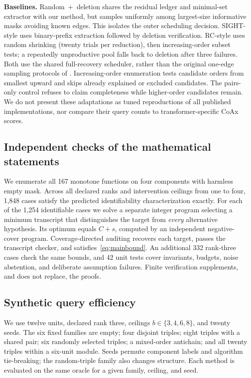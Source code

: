 \documentclass[10pt]{article}
\theoremstyle{definition}\newtheorem{definition}[theorem]{Definition}
\begin{document}
\textbf{Baselines.} Random~+~deletion shares the residual ledger and minimal-set
extractor with our method, but samples uniformly among largest-size informative
masks avoiding known edges. This isolates the outer scheduling decision. SIGHT-style
uses binary-prefix extraction followed by deletion verification. RC-style uses
random shrinking (twenty trials per reduction), then increasing-order subset tests;
a repeatedly unproductive pool falls back to deletion after three failures. Both
use the shared full-recovery scheduler, rather than the original one-edge sampling
protocols of \citet{clarfeld2019}. Increasing-order enumeration tests candidate
orders from smallest upward and skips already explained or excluded candidates.
The pairs-only control refuses to claim completeness while higher-order candidates
remain. We do not present these adaptations as tuned reproductions of all published
implementations, nor compare their query counts to transformer-specific CoAx scores.

\subsection{Independent checks of the mathematical statements}
We enumerate all 167 monotone functions on four components with harmless empty mask.
Across all declared ranks and intervention ceilings from one to four, 1,848 cases
satisfy the predicted identifiability characterization exactly. For each of the
1,254 identifiable cases we solve a separate integer program selecting a minimum
transcript that distinguishes the target from \emph{every} alternative hypothesis.
Its optimum equals $C+s$, computed by an independent negative-cover program.
Coverage-directed auditing recovers each target, passes the transcript checker, and
satisfies~\eqref{eq:mainbound}. An additional 332 rank-three cases check the same
bounds, and 42 unit tests cover invariants, budgets, noise abstention, and deliberate
assumption failures. Finite verification supplements, and does not replace, the proofs.

\subsection{Synthetic query efficiency}
We use twelve units, declared rank three, ceilings $b\in\{3,4,6,8\}$, and twenty seeds.
The six fixed families are empty; four disjoint triples; eight triples with a shared
pair; six randomly selected triples; a mixed-order antichain; and all twenty triples
within a six-unit module. Seeds permute component labels and algorithm tie-breaking;
the random-triple family also changes structure. Each method is evaluated on the
same oracle for a given family, ceiling, and seed.
\end{document}
